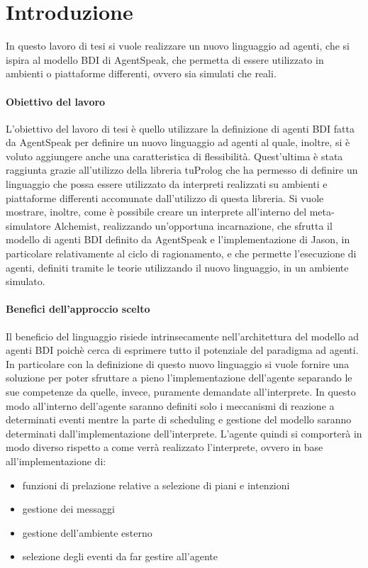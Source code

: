 \chapter{Introduzione}
\lhead[\fancyplain{}{\bfseries\thepage}]{\fancyplain{}{\bfseries\rightmark}}
In questo lavoro di tesi si vuole realizzare un nuovo linguaggio ad agenti, che si ispira al modello BDI di AgentSpeak, che permetta di essere utilizzato in ambienti o piattaforme differenti, ovvero sia simulati che reali.

\subsubsection{Obiettivo del lavoro}
L'obiettivo del lavoro di tesi è quello utilizzare la definizione di agenti BDI fatta da AgentSpeak per definire un nuovo linguaggio ad agenti al quale, inoltre, si è voluto aggiungere anche una caratteristica di flessibilità. Quest'ultima è stata raggiunta grazie all'utilizzo della libreria tuProlog che ha permesso di definire un linguaggio che possa essere utilizzato da interpreti realizzati su ambienti e piattaforme differenti accomunate dall'utilizzo di questa libreria. Si vuole mostrare, inoltre, come è possibile creare un interprete all'interno del meta-simulatore Alchemist, realizzando un'opportuna incarnazione, che sfrutta il modello di agenti BDI definito da AgentSpeak e l'implementazione di Jason, in particolare relativamente al ciclo di ragionamento, e che permette l'esecuzione di agenti, definiti tramite le teorie utilizzando il nuovo linguaggio, in un ambiente simulato.

\subsubsection{Benefici dell'approccio scelto}
Il beneficio del linguaggio risiede intrinsecamente nell'architettura del modello ad agenti BDI poichè cerca di esprimere tutto il potenziale del paradigma ad agenti.
In particolare con la definizione di questo nuovo linguaggio si vuole fornire una soluzione per poter sfruttare a pieno l'implementazione dell'agente separando le sue competenze da quelle, invece, puramente demandate all'interprete.
In questo modo all'interno dell'agente saranno definiti solo i meccanismi di reazione a determinati eventi mentre la parte di scheduling e gestione del modello saranno determinati dall'implementazione dell'interprete.
L'agente quindi si comporterà in modo diverso rispetto a come verrà realizzato l'interprete, ovvero in base all'implementazione di:
\begin{itemize}
\item funzioni di prelazione relative a selezione di piani e intenzioni
\item gestione dei messaggi
\item gestione dell'ambiente esterno
\item selezione degli eventi da far gestire all'agente
\end{itemize}
